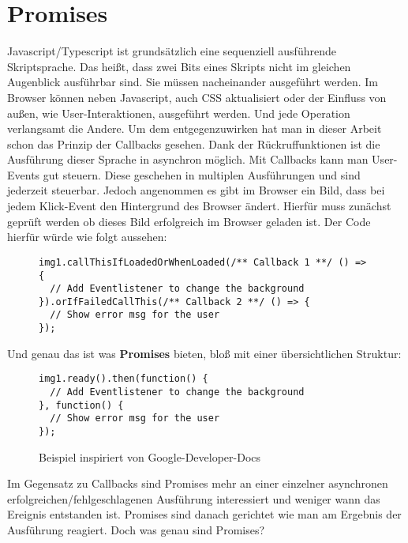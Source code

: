 \section{Promises}
Javascript/Typescript ist grundsätzlich eine sequenziell ausführende Skriptsprache. Das heißt,  dass zwei Bits eines Skripts nicht im gleichen Augenblick ausführbar sind. Sie müssen nacheinander ausgeführt werden. Im Browser können neben Javascript, auch CSS aktualisiert oder der Einfluss von außen, wie User-Interaktionen, ausgeführt werden. Und jede Operation verlangsamt die Andere. Um dem entgegenzuwirken hat man in dieser Arbeit schon das Prinzip der Callbacks gesehen. Dank der Rückruffunktionen ist die Ausführung dieser Sprache in asynchron möglich. Mit Callbacks kann man User-Events gut steuern. Diese geschehen in multiplen Ausführungen und sind jederzeit steuerbar. Jedoch angenommen es gibt im Browser ein Bild, dass bei jedem Klick-Event den Hintergrund des Browser ändert. Hierfür muss zunächst geprüft werden ob dieses Bild erfolgreich im Browser geladen ist. 
Der Code hierfür würde wie folgt aussehen:

\begin{figure}[H]
\begin{lstlisting}
img1.callThisIfLoadedOrWhenLoaded(/** Callback 1 **/ () => {
  // Add Eventlistener to change the background
}).orIfFailedCallThis(/** Callback 2 **/ () => {
  // Show error msg for the user
});
\end{lstlisting}
\end{figure}

\noindent
Und genau das ist was \textbf{Promises} bieten, bloß mit einer übersichtlichen Struktur:

\begin{figure}[H]
\begin{lstlisting}
img1.ready().then(function() {
  // Add Eventlistener to change the background
}, function() {
  // Show error msg for the user
});
\end{lstlisting}
\caption{Beispiel inspiriert von Google-Developer-Docs \cite{callback-vs-promises}}
\end{figure}

\noindent
Im Gegensatz zu Callbacks sind Promises mehr an einer einzelner asynchronen erfolgreichen/fehlgeschlagenen Ausführung interessiert und weniger wann das Ereignis entstanden ist. Promises sind danach gerichtet wie man am Ergebnis der Ausführung reagiert. 
Doch was genau sind Promises? \\


